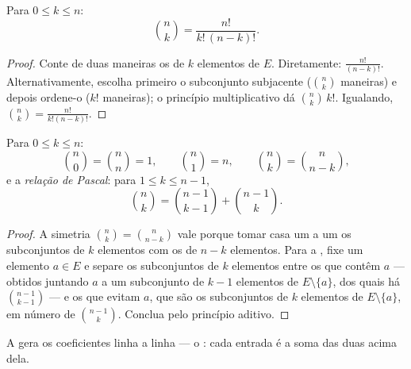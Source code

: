 \begin{theorem}\label{thm:g12:comb:binomformula}
Para $0 \leq k \leq n$:
\[
\binom{n}{k} = \frac{n!}{k!\,(n-k)!} .
\]
\end{theorem}

\begin{proof}
Conte de duas maneiras os  de $k$ elementos de $E$. Diretamente:
$\frac{n!}{(n-k)!}$. Alternativamente, escolha primeiro o subconjunto
subjacente ($\binom nk$ maneiras) e depois ordene-o ($k!$ maneiras); o
princípio multiplicativo dá $\binom{n}{k}\,k!$. Igualando,
$\binom nk = \frac{n!}{k!(n-k)!}$.
\end{proof}

\begin{proposition}\label{prop:g12:comb:identities}
Para $0 \leq k \leq n$:
\[
\binom{n}{0} = \binom{n}{n} = 1, \qquad
\binom{n}{1} = n, \qquad
\binom{n}{k} = \binom{n}{n-k},
\]
e a \emph{relação de Pascal}: para
$1 \leq k \leq n-1$,
\[
\binom{n}{k} = \binom{n-1}{k-1} + \binom{n-1}{k}.
\]
\end{proposition}

\begin{proof}
A simetria $\binom nk = \binom{n}{n-k}$ vale porque tomar 
casa um a um os subconjuntos de $k$ elementos com os de $n-k$ elementos.
Para a , fixe um elemento $a \in E$ e separe os
subconjuntos de $k$ elementos entre os que contêm $a$ --- obtidos juntando
$a$ a um subconjunto de $k-1$ elementos de $E \setminus \{a\}$, dos quais
há $\binom{n-1}{k-1}$ --- e os que evitam $a$, que são os subconjuntos de
$k$ elementos de $E \setminus \{a\}$, em número de $\binom{n-1}{k}$.
Conclua pelo princípio aditivo.
\end{proof}

A  gera os coeficientes linha a linha --- o
\emph{}: cada entrada é a soma das duas acima dela.

